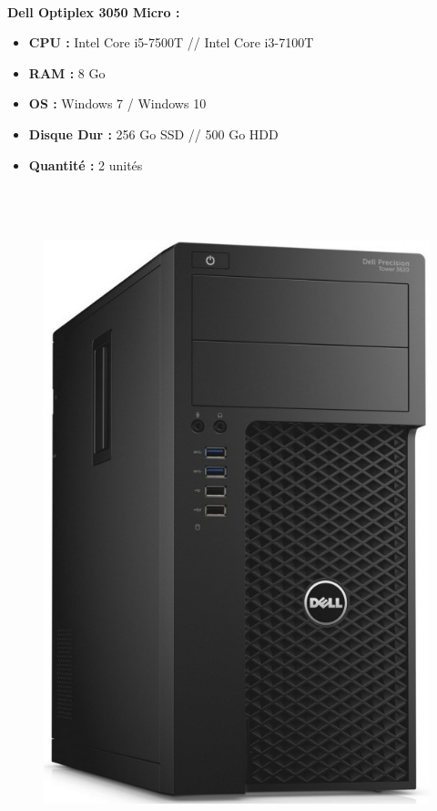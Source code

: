 \documentclass[11pt,a4paper,oneside]{article}
\begin{document}
\paragraph{}\textbf{Dell Optiplex 3050 Micro :} \\
\begin{itemize}
\item \textbf{CPU :} Intel Core i5-7500T // Intel Core i3-7100T
\item \textbf{RAM :} 8 Go
\item \textbf{OS :} Windows 7 / Windows 10
\item \textbf{Disque Dur :} 256 Go SSD // 500 Go HDD
\item \textbf{Quantité :} 2 unités
\\ \\ \\ \\
\end{itemize}
\begin{figure}
\includegraphics[scale=0.3]{Ressources/Materiel/3620.jpg}\vspace{-2cm}
\end{figure}
\end{document}
